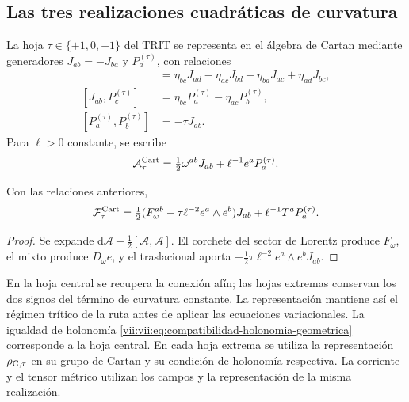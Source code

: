 \subsection{Las tres realizaciones cuadráticas de curvatura}

La hoja \(\tau\in\{+1,0,-1\}\) del TRIT se representa en
el álgebra de Cartan mediante generadores \(J_{ab}=-J_{ba}\)
y \(P_a^{(\tau)}\), con relaciones
\begin{align*}
 [J_{ab},J_{cd}]&=
 \eta_{bc}J_{ad}-\eta_{ac}J_{bd}
 -\eta_{bd}J_{ac}+\eta_{ad}J_{bc},\\
 [J_{ab},P_c^{(\tau)}]&=
 \eta_{bc}P_a^{(\tau)}-\eta_{ac}P_b^{(\tau)},\\
 [P_a^{(\tau)},P_b^{(\tau)}]&=-\tau J_{ab}.
\end{align*}
Para \(\ell>0\) constante, se escribe
\[
 \mathcal A_\tau^{\rm Cart}
 =\tfrac12\omega^{ab}J_{ab}+\ell^{-1}e^aP_a^{(\tau)}.
\]

\begin{proposition}
\label{vii:vii:prop:curvatura-tritificada}
Con las relaciones anteriores,
\begin{equation}
 \mathcal F_\tau^{\rm Cart}
 =\tfrac12(F_\omega^{ab}-\tau\ell^{-2}e^a\wedge e^b)J_{ab}
     +\ell^{-1}T^aP_a^{(\tau)}.
 \label{vii:vii:eq:curvatura-tritificada}
\end{equation}
\end{proposition}
\begin{proof}
Se expande \(\mathrm d\mathcal A+\tfrac12[\mathcal A,\mathcal A]\).
El corchete del sector de Lorentz produce \(F_\omega\), el
mixto produce \(D_\omega e\), y el traslacional aporta
\(-\tfrac12\tau\ell^{-2}e^a\wedge e^bJ_{ab}\).
\end{proof}

En la hoja central se recupera la conexión afín; las hojas extremas
conservan los dos signos del término de curvatura constante. La
representación mantiene así el régimen trítico de la ruta antes de
aplicar las ecuaciones variacionales. La igualdad de holonomía
\eqref{vii:vii:eq:compatibilidad-holonomia-geometrica} corresponde a la
hoja central. En cada hoja extrema se utiliza la representación
\(\rho_{{\rm C},\tau}\) en su grupo de Cartan y su condición
de holonomía respectiva. La corriente y el tensor métrico utilizan
los campos y la representación de la misma realización.
